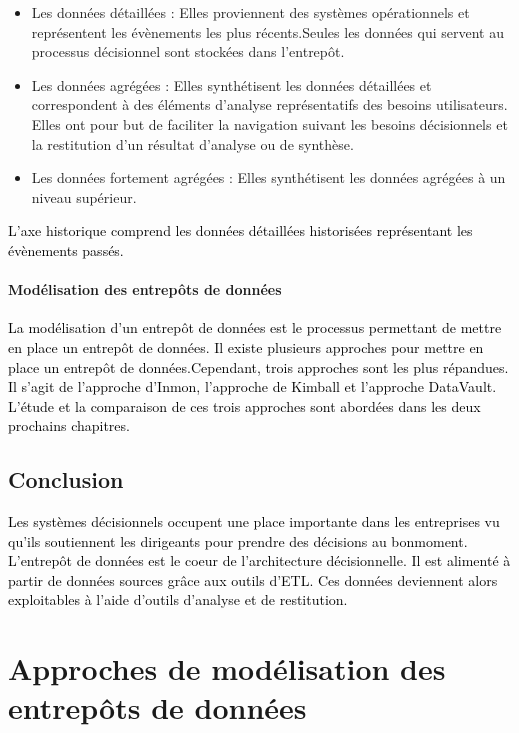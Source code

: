 \documentclass[a4paper,12pt]{report}
\begin{document}
\begin{itemize}
	\item  Les données détaillées : Elles proviennent des systèmes opérationnels et représentent les évènements les plus récents.Seules les données qui servent au processus décisionnel sont stockées dans l’entrepôt.
  	\item  Les données agrégées : Elles synthétisent les données détaillées et correspondent à des éléments d’analyse représentatifs des besoins utilisateurs. Elles ont pour but
de faciliter la navigation suivant les besoins décisionnels et la restitution d’un résultat d’analyse ou de synthèse.
	\item  Les données fortement agrégées : Elles synthétisent les données agrégées à un niveau supérieur.

\end{itemize}

\textcolor{black}{L’axe historique comprend les données détaillées historisées représentant les évènements passés.}

\subsubsection{Modélisation des entrepôts de données}
\textcolor{black}{La modélisation d’un entrepôt de données est le processus permettant de mettre en place un entrepôt de données. Il existe plusieurs approches pour mettre en place un entrepôt de données.Cependant, trois approches sont les plus répandues. Il s’agit de l’approche d’Inmon, l’approche de Kimball et l’approche DataVault.}
\textcolor{black}{L’étude et la comparaison de ces trois approches sont abordées dans les deux prochains chapitres.}


\section*{Conclusion}

\textcolor{black}{Les systèmes décisionnels occupent une place importante dans les entreprises vu qu’ils soutiennent les dirigeants pour prendre des décisions au bonmoment.}
\textcolor{black}{L’entrepôt de données est le coeur de l’architecture décisionnelle. Il est alimenté à partir de données sources grâce aux outils d’ETL. Ces données deviennent alors exploitables à l’aide d’outils d’analyse et de restitution.}



\chapter{Approches de modélisation des entrepôts de données}
\end{document}
